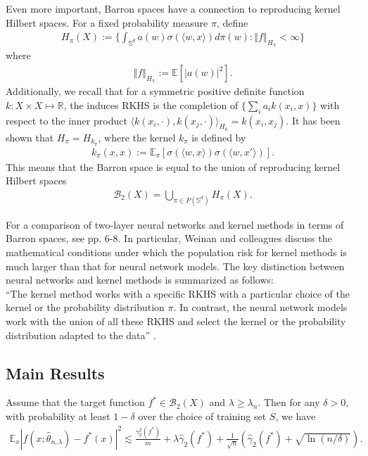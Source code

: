 \documentclass{article}
\newenvironment{manualtheorem}[1]{%
  \renewcommand\themanualtheoreminner{#1}%
  \manualtheoreminner
}{\endmanualtheoreminner}
\begin{document}
Even more important, Barron spaces have a connection to reproducing kernel Hilbert spaces. For a fixed probability measure $\pi$, define 
\begin{align*}
    H_{\pi}(X) := \bigg\{  \int_{\mathbb{S}^d} a(w) \sigma(\langle w, x \rangle) d \pi(w) : \left\Vert f \right\Vert_{H_{\pi}} < \infty \bigg\}
\end{align*}
where
\begin{align*}
    \left\Vert f\right\Vert_{H_{\pi}} := \mathbb{E}[|a(w)|^2].
\end{align*}
Additionally, we recall that for a symmetric positive definite function $k: X \times X \mapsto \mathbb{R}$, the induces RKHS is the completion of $\{ \sum_i a_i k(x_i, x) \}$ with respect to the inner product $\langle k(x_i, \cdot), k(x_j, \cdot) \rangle_{H_k} = k(x_i, x_j)$. It has been shown that $H_{\pi} = H_{k_{\pi}}$, where the kernel $k_{\pi}$ is defined by 
\begin{align*}
    k_{\pi}(x, x) := \mathbb{E}_{\pi}[\sigma(\langle w, x \rangle)\sigma(\langle w, x' \rangle)].
\end{align*}
This means that the Barron space is equal to the union of reproducing kernel Hilbert spaces
\begin{align*}
    \mathcal{B}_2(X) = \underset{\pi \in P(\mathbb{S}^d)}{\bigcup} H_{\pi}(X).
\end{align*}

For a comparison of two-layer neural networks and kernel methods in terms of Barron spaces, see \cite{ma2018priori} pp. 6-8. In particular, Weinan and colleagues discuss the mathematical conditions under which the population risk for kernel methods is much larger than that for neural network models. The key distinction between neural networks and kernel methods is summarized as follows:\\ \enquote{The kernel method works with a specific RKHS with a particular choice of the kernel or the probability distribution $\pi$. In contrast, the neural network models work with the union of all these RKHS and select the kernel or the probability distribution adapted to the data} \cite{ma2018priori}.

\subsection{Main Results}

\begin{manualtheorem}{4.1}
Assume that the target function $f^* \in \mathcal{B}_2(X)$ and $\lambda \geq \lambda_n.$ Then for any $\delta > 0$, with probability at least $1 - \delta$ over the choice of training set $S$, we have
\begin{align*}
    \mathbb{E}_x|f(x; \hat{\theta}_{n, \lambda}) - f^*(x)|^2 \lesssim \frac{\gamma_2^2(f^*)}{m} + \lambda \hat{\gamma}_2(f^*) + \frac{1}{\sqrt{n}}(\hat{\gamma}_2(f^*) + \sqrt{\ln{(n/\delta)}}).
\end{align*}
\end{manualtheorem}
\end{document}
